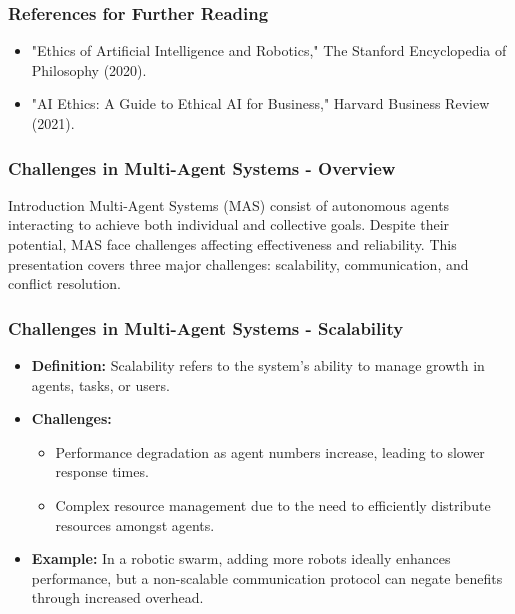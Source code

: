 \documentclass[aspectratio=169]{beamer}
\begin{document}
\begin{frame}[fragile]
    \frametitle{References for Further Reading}
    \begin{itemize}
        \item "Ethics of Artificial Intelligence and Robotics," The Stanford Encyclopedia of Philosophy (2020).
        \item "AI Ethics: A Guide to Ethical AI for Business," Harvard Business Review (2021).
    \end{itemize}
\end{frame}

\begin{frame}[fragile]
    \frametitle{Challenges in Multi-Agent Systems - Overview}
    \begin{block}{Introduction}
    Multi-Agent Systems (MAS) consist of autonomous agents interacting to achieve both individual and collective goals. Despite their potential, MAS face challenges affecting effectiveness and reliability. This presentation covers three major challenges: scalability, communication, and conflict resolution.
    \end{block}
\end{frame}

\begin{frame}[fragile]
    \frametitle{Challenges in Multi-Agent Systems - Scalability}
    \begin{itemize}
        \item \textbf{Definition:} Scalability refers to the system's ability to manage growth in agents, tasks, or users.
        \item \textbf{Challenges:}
        \begin{itemize}
            \item Performance degradation as agent numbers increase, leading to slower response times.
            \item Complex resource management due to the need to efficiently distribute resources amongst agents.
        \end{itemize}
        \item \textbf{Example:} In a robotic swarm, adding more robots ideally enhances performance, but a non-scalable communication protocol can negate benefits through increased overhead.
    \end{itemize}
\end{frame}
\end{document}
